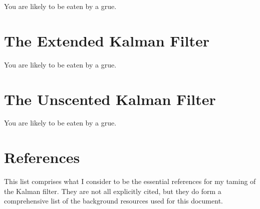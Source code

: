 \documentclass[12pt]{article}
\begin{document}
You are likely to be eaten by a grue.

\clearpage



\section{The Extended Kalman Filter}

You are likely to be eaten by a grue.

\clearpage



\section{The Unscented Kalman Filter}
\label{The Unscented Kalman Filter}

You are likely to be eaten by a grue.

\clearpage



\section{References}

This list comprises what I consider to be the essential references for my taming of
the Kalman filter. They are not all explicitly cited, but they do form a comprehensive
list of the background resources used for this document.

\renewcommand{\refname}{}
\vspace{-11mm}
\end{document}
